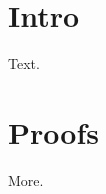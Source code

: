 \documentclass[conference]{IEEEtran}
\renewcommand{\appendix}{\appendices}
\begin{document}
\section{Intro}
Text.
\appendix
\section{Proofs}
More.
\end{document}
